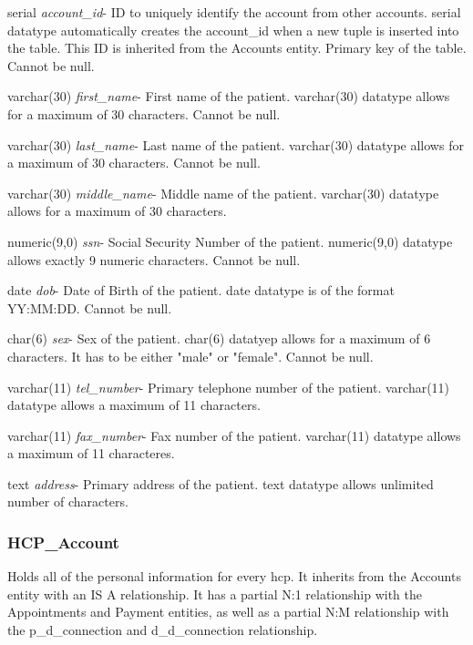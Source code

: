 \documentclass[12pt]{report}
\begin{document}
\begin{description}
\item serial \textit{account\_id}- ID to uniquely identify the account from other accounts. serial datatype automatically creates the account\_id when a new tuple is inserted into the table.  This ID is inherited from the Accounts entity. Primary key of the table.  Cannot be null.
\item varchar(30) \textit{first\_name}-  First name of the patient.  varchar(30) datatype allows for a maximum of 30 characters.  Cannot be null.
\item varchar(30) \textit{last\_name}- Last name of the patient.  varchar(30) datatype allows for a maximum of 30 characters.  Cannot be null.
\item varchar(30) \textit{middle\_name}- Middle name of the patient. varchar(30) datatype allows for a maximum of 30 characters.
\item numeric(9,0) \textit{ssn}- Social Security Number of the patient. numeric(9,0) datatype allows exactly 9 numeric characters.  Cannot be null.
\item date \textit{dob}- Date of Birth of the patient.  date datatype is of the format YY:MM:DD.  Cannot be null.
\item char(6) \textit{sex}- Sex of the patient. char(6) datatyep allows for a maximum of 6 characters.  It has to be either "male" or "female".  Cannot be null.
\item varchar(11) \textit{tel\_number}- Primary telephone number of the patient.  varchar(11) datatype allows a maximum of 11 characters.
\item varchar(11) \textit{fax\_number}- Fax number of the patient.  varchar(11) datatype allows a maximum of 11 characteres.
\item text \textit{address}- Primary address of the patient.  text datatype allows unlimited number of characters.
\end{description}

\subsubsection{HCP\_Account}
Holds all of the personal information for every hcp.  It inherits from the Accounts entity with an IS A relationship.  It has a partial N:1 relationship with the Appointments and Payment entities, as well as a partial N:M relationship with the p\_d\_connection and d\_d\_connection relationship.
\end{document}
